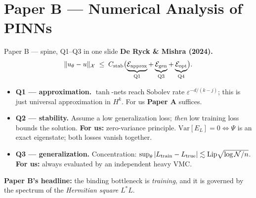 \documentclass[10pt,aspectratio=169]{beamer}
\newcommand{\paperA}[1]{\textcolor{papA}{\textbf{#1}}}
\newcommand{\paperB}[1]{\textcolor{papB}{\textbf{#1}}}
\newcommand{\ours}[1]{\textcolor{ourwork}{\textbf{#1}}}
\begin{document}
\section{Paper B --- Numerical Analysis of PINNs}

\begin{frame}{Paper B --- spine, Q1--Q3 in one slide}
\paperB{De Ryck \& Mishra (2024).}
\small
\[
  \|u_\theta - u\|_{\mathcal X}
  \;\le\; C_{\rm stab}\bigl(\underbrace{\mathcal E_{\rm approx}}_{\text{Q1}}
  + \underbrace{\mathcal E_{\rm gen}}_{\text{Q3}}
  + \underbrace{\mathcal E_{\rm opt}}_{\text{Q4}}\bigr).
\]
\begin{itemize}\setlength\itemsep{1pt}\small
\item \paperB{Q1 --- approximation.} $\tanh$-nets reach Sobolev rate $\varepsilon^{-d/(k-j)}$;
this is just universal approximation in $H^k$. For us \paperA{Paper A} suffices.
\item \paperB{Q2 --- stability.} Assume a low generalization loss; \emph{then} low training loss bounds
the solution. \ours{For us:} zero-variance principle. $\mathrm{Var}[E_L]=0 \iff \Psi$ is an exact
eigenstate; both losses vanish together.
\item \paperB{Q3 --- generalization.} Concentration:
$\sup_\theta|L_{\rm train}-L_{\rm true}|\lesssim \mathrm{Lip}\sqrt{\log\mathcal N/n}$.
\ours{For us:} always evaluated by an independent heavy VMC.
\end{itemize}

\vspace{2pt}
\begin{tcolorbox}[colback=papB!5,colframe=papB!60,boxsep=2pt]
\small \textbf{Paper B's headline:} the binding bottleneck is \emph{training}, and it is governed by
the spectrum of the \emph{Hermitian square} $L^\ast L$.
\end{tcolorbox}
\end{frame}
\end{document}
